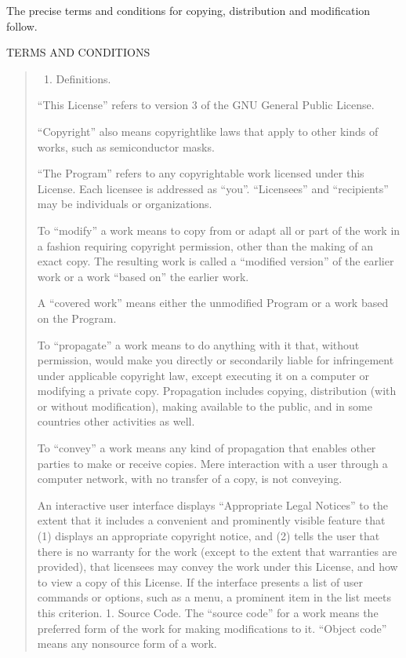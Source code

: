 \documentclass[letterpaper,10pt,english]{sphinxmanual}
\begin{document}
The precise terms and conditions for copying, distribution and modification follow.

TERMS AND CONDITIONS
\begin{quote}
\begin{enumerate}
%
\setcounter{enumi}{-1}
\item {} 
Definitions.

\end{enumerate}

“This License” refers to version 3 of the GNU General Public License.

“Copyright” also means copyright\sphinxhyphen{}like laws that apply to other kinds of works, such as semiconductor masks.

“The Program” refers to any copyrightable work licensed under this License. Each licensee is addressed as “you”. “Licensees” and “recipients” may be individuals or organizations.

To “modify” a work means to copy from or adapt all or part of the work in a fashion requiring copyright permission, other than the making of an exact copy. The resulting work is called a “modified version” of the earlier work or a work “based on” the earlier work.

A “covered work” means either the unmodified Program or a work based on the Program.

To “propagate” a work means to do anything with it that, without permission, would make you directly or secondarily liable for infringement under applicable copyright law, except executing it on a computer or modifying a private copy. Propagation includes copying, distribution (with or without modification), making available to the public, and in some countries other activities as well.

To “convey” a work means any kind of propagation that enables other parties to make or receive copies. Mere interaction with a user through a computer network, with no transfer of a copy, is not conveying.

An interactive user interface displays “Appropriate Legal Notices” to the extent that it includes a convenient and prominently visible feature that (1) displays an appropriate copyright notice, and (2) tells the user that there is no warranty for the work (except to the extent that warranties are provided), that licensees may convey the work under this License, and how to view a copy of this License. If the interface presents a list of user commands or options, such as a menu, a prominent item in the list meets this criterion.
1. Source Code.
The “source code” for a work means the preferred form of the work for making modifications to it. “Object code” means any non\sphinxhyphen{}source form of a work.


\end{quote}
\end{document}
